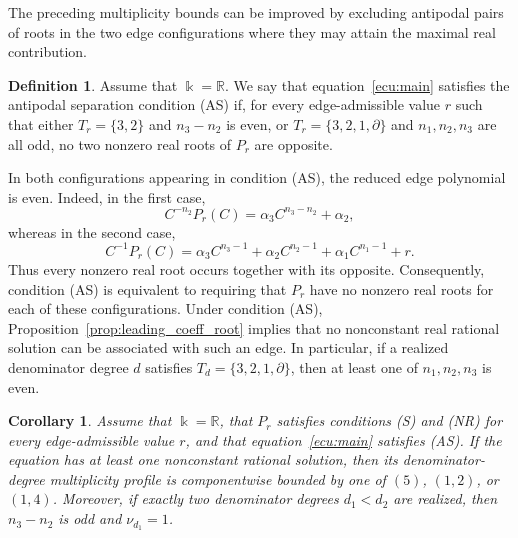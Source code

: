 \documentclass[12pt,a4paper]{amsart}
\numberwithin{theorem}{section}
\newtheorem{corollary}[theorem]{Corollary}
\theoremstyle{definition}
\newtheorem{definition}[theorem]{Definition}
\begin{document}
	The preceding multiplicity bounds can be improved by excluding antipodal pairs of roots in the two edge configurations where they may attain the maximal real contribution.
	
	\begin{definition}\label{def:antipodal-separation} 
		Assume that $\Bbbk=\mathbb{R}$. We say that equation~\eqref{ecu:main} satisfies the antipodal separation condition {\rm (AS)} if, for every edge-admissible value $r$ such that either $T_r=\{3,2\}$ and $n_3-n_2$ is even, or $T_r=\{3,2,1,\partial\}$ and $n_1,n_2,n_3$ are all odd, no two nonzero real roots of $P_r$ are opposite. 
	\end{definition}
	
	In both configurations appearing in condition {\rm (AS)}, the reduced edge polynomial is even. Indeed, in the first case,
	\[
	C^{-n_2}P_r(C)=\alpha_3C^{n_3-n_2}+\alpha_2,
	\]
	whereas in the second case,
	\[
	C^{-1}P_r(C)=\alpha_3C^{n_3-1}
	+\alpha_2C^{n_2-1}+\alpha_1C^{n_1-1}+r.
	\]
	Thus every nonzero real root occurs together with its opposite. Consequently, condition {\rm (AS)} is equivalent to requiring that $P_r$ have no nonzero real roots for each of these configurations. Under condition {\rm (AS)}, Proposition~\ref{prop:leading_coeff_root} implies  that no nonconstant real rational solution can be associated with such an edge. In particular, if a realized denominator degree $d$ satisfies $T_d=\{3,2,1,\partial\}$, then at least one of $n_1,n_2,n_3$ is even.
	
	\begin{corollary}\label{cor:real-multiplicity-profiles}
		Assume that $\Bbbk=\mathbb{R}$, that $P_r$ satisfies conditions {\rm (S)} and {\rm (NR)} for every edge-admissible value $r$, and that equation~\eqref{ecu:main} satisfies {\rm (AS)}. If the equation has at least one nonconstant rational solution, then its denominator-degree multiplicity profile is componentwise bounded by one of $(5)$, $(1,2)$, or $(1,4)$. Moreover, if exactly two denominator degrees $d_1<d_2$ are realized, then $n_3-n_2$ is odd and $\nu_{d_1}=1$.
	\end{corollary}
	
\end{document}
